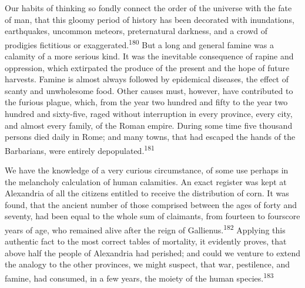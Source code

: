 


Our habits of thinking so fondly connect the order of the
universe with the fate of man, that this gloomy period of history
has been decorated with inundations, earthquakes, uncommon
meteors, preternatural darkness, and a crowd of prodigies
fictitious or exaggerated.\textsuperscript{180} But a long and general famine was
a calamity of a more serious kind. It was the inevitable
consequence of rapine and oppression, which extirpated the
produce of the present and the hope of future harvests. Famine is
almost always followed by epidemical diseases, the effect of
scanty and unwholesome food. Other causes must, however, have
contributed to the furious plague, which, from the year two
hundred and fifty to the year two hundred and sixty-five, raged
without interruption in every province, every city, and almost
every family, of the Roman empire. During some time five thousand
persons died daily in Rome; and many towns, that had escaped the
hands of the Barbarians, were entirely depopulated.\textsuperscript{181}



We have the knowledge of a very curious circumstance, of some use
perhaps in the melancholy calculation of human calamities. An
exact register was kept at Alexandria of all the citizens
entitled to receive the distribution of corn. It was found, that
the ancient number of those comprised between the ages of forty
and seventy, had been equal to the whole sum of claimants, from
fourteen to fourscore years of age, who remained alive after the
reign of Gallienus.\textsuperscript{182} Applying this authentic fact to the most
correct tables of mortality, it evidently proves, that above half
the people of Alexandria had perished; and could we venture to
extend the analogy to the other provinces, we might suspect, that
war, pestilence, and famine, had consumed, in a few years, the
moiety of the human species.\textsuperscript{183}



